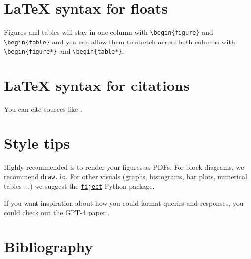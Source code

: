 \documentclass[a4paper,11pt]{article}
\begin{document}
\author{Firstname Lastname (r0??????)}

\twocolumn[\maketitle]


\section{\LaTeX{} syntax for floats}
Figures and tables will stay in one column with \verb|\begin{figure}| and \verb|\begin{table}| and you can allow them to stretch across both columns with \verb|\begin{figure*}| and \verb|\begin{table*}|.

\section{\LaTeX{} syntax for citations}
You can cite sources like \textcite{ouyang_training_2022}.

\section{Style tips}
Highly recommended is to render your figures as PDFs. For block diagrams, we recommend \href{https://draw.io}{\texttt{draw.io}}. For other visuals (graphs, histograms, bar plots, numerical tables ...) we suggest the \href{https://github.com/bauwenst/fiject}{\texttt{fiject}} Python package.

If you want inspiration about how you could format queries and responses, you could check out the GPT-4 paper \parencite{bubeck_sparks_2023}.


\newpage
\onecolumn
\appendix

\section*{Bibliography}
\printbibliography[heading=none]
\end{document}
